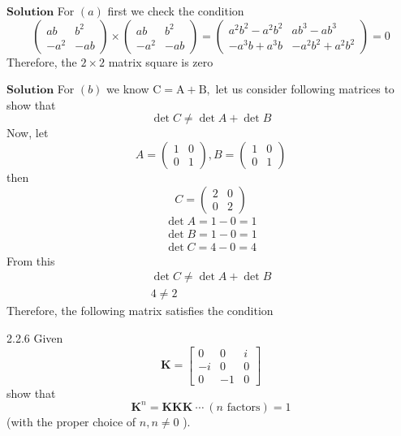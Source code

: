 \documentclass{article}
\begin{document}
\begin{flushleft}
$\boxed{\textbf{Solution}}$ For $(a)$ first we check the condition
$$
\left(\begin{array}{cc}
a b & b^{2} \\
-a^{2} & -a b
\end{array}\right) \times\left(\begin{array}{cc}
a b & b^{2} \\
-a^{2} & -a b
\end{array}\right)=\left(\begin{array}{cc}
a^{2} b^{2}-a^{2} b^{2} & a b^{3}-a b^{3} \\
-a^{3} b+a^{3} b & -a^{2} b^{2}+a^{2} b^{2}
\end{array}\right)=0
$$
Therefore, the $2\times 2$ matrix square is zero

$\boxed{\textbf{Solution}}$ For $(b)$ we know $\mathrm{C}=\mathrm{A}+\mathrm{B},$ let us consider following matrices to show that
$$
\operatorname{det} C \neq \operatorname{det} A+\operatorname{det} B
$$
Now, let
$$
A=\left(\begin{array}{ll}
1 & 0 \\
0 & 1
\end{array}\right), B=\left(\begin{array}{ll}
1 & 0 \\
0 & 1
\end{array}\right)
$$
then 
$$
C=\left(\begin{array}{ll}
2 & 0 \\
0 & 2
\end{array}\right)
$$
$$
\begin{array}{l}
\operatorname{det} A=1-0=1 \\
\operatorname{det} B=1-0=1 \\
\operatorname{det} C=4-0=4
\end{array}
$$
From this
$$
\begin{array}{l}
\operatorname{det} C \neq \operatorname{det} A+\operatorname{det} B \\
4 \neq 2
\end{array}
$$
Therefore, the following matrix satisfies the condition


\begin{mybox}{2.2.6}
Given
$$
\mathbf{K}=\begin{bmatrix}{0} & {0} & {i} \\ {-i} & {0} & {0} \\ {0} & {-1} & {0}\end{bmatrix}
$$
show that
$$
\mathbf{K}^{n}=\mathbf{KKK} \ \cdots \ (n \text { factors})=1
$$
(with the proper choice of $n, n \neq 0$ ).
\end{mybox}




\end{flushleft}
\end{document}
